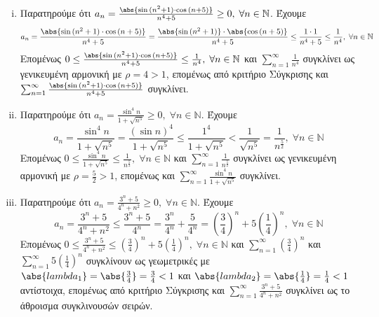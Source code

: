 \begin{enumerate}
\begin{enumerate}[i)]
        \item Παρατηρούμε ότι $ a_{n} = \frac{\abs{\sin{(n^{2}+1)} \cdot 
            \cos{(n+5)}}}{n^{4}+5} \geq 0, \; \forall n \in \mathbb{N}$. Έχουμε
            \[
                a_{n} = \frac{\abs{\sin{(n^{2}+1)} \cdot \cos{(n+5)}}}{n^{4}+5} = 
                \frac{\abs{\sin{(n^{2}+1)}} \cdot \abs{\cos{(n+5)}}}{n^{4}+5} \leq
                \frac{1 \cdot 1}{n^{4}+5} \leq \frac{1}{n^{4}}, \; \forall n 
                \in \mathbb{N}
            \] 
            Επομένως $ 0 \leq  \frac{\abs{\sin{(n^{2}+1)} \cdot 
            \cos{(n+5)}}}{n^{4}+5} \leq \frac{1}{n^{4}}, \; \forall n \in 
            \mathbb{N} $ και $ \sum_{n=1}^{\infty} \frac{1}{n^{4}} $ συγκλίνει 
            ως γενικευμένη αρμονική με $ \rho = 4 > 1 $, επομένως από 
            κριτήριο Σύγκρισης και $ \sum_{n=1}^{\infty} \frac{\abs{\sin{(n^{2}+1)}
            \cdot \cos{(n+5)}}}{n^{4}+5}  $ συγκλίνει.

        \item Παρατηρούμε ότι $ a_{n} = \frac{\sin^{4}{n}}{1+ \sqrt{n^{5}}} \geq 0, 
            \; \forall n \in \mathbb{N}$. Έχουμε
            \[
                a_{n} =  \frac{\sin^{4}{n}}{1+ \sqrt{n^{5}}} = \frac{(\sin{n} )^{4}}{1+
                \sqrt{n^{5}}} \leq \frac{1^{4}}{1+ \sqrt{n^{5}}} < 
                \frac{1}{\sqrt{n^{5}}} = \frac{1}{n^{\frac{5}{2}}}, \; 
                \forall n \in \mathbb{N}
            \] 
            Επομένως $ 0 \leq \frac{\sin^{4}{n}}{1 + \sqrt{n^{5}}} \leq
            \frac{1}{n^{\frac{5}{2}}}, \; \forall n \in \mathbb{N} $ και 
            $ \sum_{n=1}^{\infty} \frac{1}{n^{\frac{5}{2}}} $ συγκλίνει ως 
            γενικευμένη αρμονική με $ \rho = \frac{5}{2} > 1 $, επομένως και 
            $ \sum_{n=1}^{\infty} \frac{\sin^{4}{n}}{1 + \sqrt{n^{5}}} $ συγκλίνει.

        \item Παρατηρούμε ότι $ a_{n}= \frac{3^{n}+5}{4^{n}+n^{2}} \geq 0, 
            \; \forall n \in \mathbb{N}$. Έχουμε
            \[
                a_{n} = \frac{3^{n}+5}{4^{n}+n^{2}} \leq \frac{3^{n}+5}{4^{n}} = 
                \frac{3^{n}}{4^{n}} + \frac{5}{4^{n}} = 
                \left(\frac{3}{4}\right)^{n} + 5 \left(\frac{1}{4}\right)^{n} , \; 
                \forall n \in \mathbb{N}
            \] 
            Επομένως $ 0 \leq \frac{3^{n}+5}{4^{n}+n^{2}} \leq 
            \left(\frac{3}{4}\right)^{n} + 5 \left(\frac{1}{4}\right)^{n}, \; 
            \forall n \in \mathbb{N} $ και $ 
            \sum_{n=1}^{\infty} (\frac{3}{4} )^{n}  $ και $
            \sum_{n=1}^{\infty} 5 (\frac{1}{4} )^{n} $ συγκλίνουν ως γεωμετρικές με 
            $ \abs{lambda_{1}} = \abs{\frac{3}{4}} = \frac{3}{4} < 1 $ και 
            $ \abs{lambda_{2}} = \abs{\frac{1}{4}} = \frac{1}{4} < 1 $ αντίστοιχα, 
            επομένως από κριτήριο Σύγκρισης και 
            $ \sum_{n=1}^{\infty} \frac{3^{n}+5}{4^{n}+n^{2}} $ 
            συγκλίνει ως το άθροισμα συγκλινουσών σειρών.


\end{enumerate}
\end{enumerate}
